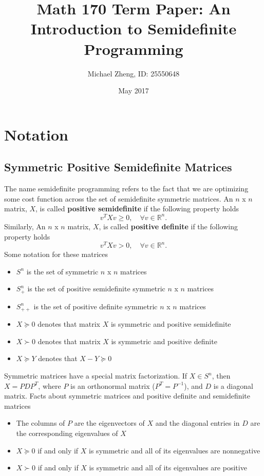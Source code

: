 \documentclass{article}
\begin{document}
\title{Math 170 Term Paper: An Introduction to Semidefinite Programming}
\author{Michael Zheng, ID: 25550648}
\date{May 2017}
\maketitle
\clearpage
\section{Notation}
\subsection{Symmetric Positive Semidefinite Matrices}
The name semidefinite programming refers to the fact that we are optimizing some cost function across the set of semidefinite symmetric matrices. An $n$ x $n$ matrix, $X$, is called \textbf{positive semidefinite} if the following property holds
\[v^TXv \geq 0, \quad \forall v \in \mathbb{R}^n.\]
Similarly, An $n$ x $n$ matrix, $X$, is called \textbf{positive definite} if the following property holds
\[v^TXv > 0, \quad \forall v \in \mathbb{R}^n.\]
Some notation for these matrices
\begin{itemize}
\item $S^n$ is the set of symmetric $n$ x $n$ matrices 
\item $S^n_+$ is the set of positive semidefinite symmetric $n$ x $n$ matrices
\item $S^n_{++}$ is the set of positive definite symmetric $n$ x $n$ matrices
\item $X \succeq 0$ denotes that matrix $X$ is symmetric and positive semidefinite
\item $X \succ 0$ denotes that matrix $X$ is symmetric and positive definite
\item $X \succeq Y$ denotes that $X-Y \succeq 0$
\end{itemize}
Symmetric matrices have a special matrix factorization. If $X \in S^n$, then $X = PDP^T$, where $P$ is an orthonormal matrix ($P^T = P^{-1}$), and $D$ is a diagonal matrix. Facts about symmetric matrices and positive definite and semidefinite matrices
\begin{itemize}
\item The columns of $P$ are the eigenvectors of $X$ and the diagonal entries in $D$ are the corresponding eigenvalues of $X$
\item $X \succeq 0$ if and only if $X$ is symmetric and all of its eigenvalues are nonnegative
\item  $X \succ 0$ if and only if $X$ is symmetric and all of its eigenvalues are positive
\end{itemize}
\clearpage
\end{document}
